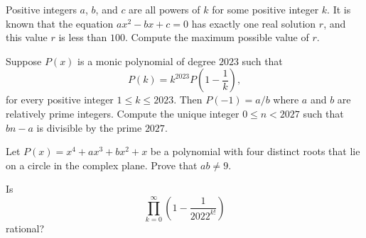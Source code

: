 \documentclass[11pt]{article}
\theoremstyle{definition}
\begin{document}
\begin{question}[name={2022 HMMT, Algebra \& Number Theory, \href{https://artofproblemsolving.com/community/c4p24651449}{Problem 1}}]
	Positive integers $a$, $b$, and $c$ are all powers of $k$ for some positive integer $k$. It is known that the equation $ax^2-bx+c=0$ has exactly one real solution $r$, and this value $r$ is less than $100$. Compute the maximum possible value of $r$.	
\end{question}


%	








\begin{question}[name={2022 HMMT, Algebra \& Number Theory, \href{https://artofproblemsolving.com/community/c4p24651863}{Problem 9}}]
	Suppose $P(x)$ is a monic polynomial of degree $2023$ such that $$P(k) = k^{2023}P\left(1-\frac{1}{k}\right),$$ for every positive integer $1 \leq k \leq 2023$. Then $P(-1) = {a}/{b}$ where $a$ and $b$ are relatively prime integers. Compute the unique integer $0 \leq n < 2027$ such that $bn-a$ is divisible by the prime $2027$.	
\end{question}


%	






\begin{question}[name={2022 HMMT, Team, \href{https://artofproblemsolving.com/community/c4p24681302}{Problem 6}}]
	Let $P(x) = x^4 + ax^3 + bx^2 + x$ be a polynomial with four distinct roots that lie on a circle in the complex plane. Prove that $ab\ne 9$.	
\end{question}


%	






\begin{question}[name={2022 HMIC, \href{https://artofproblemsolving.com/community/c4p24910314}{Problem 1}}]
	Is $$\prod_{k=0}^\infty \left(1-\frac{1}{2022^{k!}}\right)$$
	rational?
\end{question}
\end{document}
